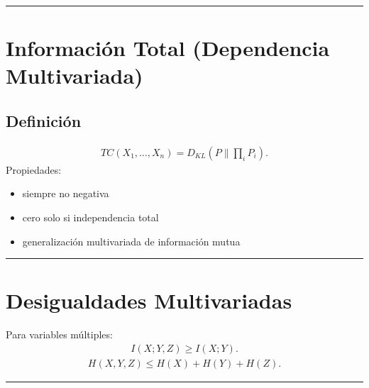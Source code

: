\documentclass[letterpaper,10pt,english]{jupyterBook}
\begin{document}
\bigskip\hrule\bigskip



\section{Información Total (Dependencia Multivariada)}
\label{\detokenize{02_mathematical_foundations/properties_theorems:informacion-total-dependencia-multivariada}}

\subsection{Definición}
\label{\detokenize{02_mathematical_foundations/properties_theorems:definicion}}\begin{equation*}
\begin{split}
TC(X_1,\dots,X_n)=
D_{KL}(P\|\prod_i P_i).
\end{split}
\end{equation*}
\sphinxAtStartPar
Propiedades:
\begin{itemize}
\item {} 
\sphinxAtStartPar
siempre no negativa

\item {} 
\sphinxAtStartPar
cero solo si independencia total

\item {} 
\sphinxAtStartPar
generalización multivariada de información mutua

\end{itemize}


\bigskip\hrule\bigskip



\section{Desigualdades Multivariadas}
\label{\detokenize{02_mathematical_foundations/properties_theorems:desigualdades-multivariadas}}
\sphinxAtStartPar
Para variables múltiples:
\begin{equation*}
\begin{split}
I(X;Y,Z)\ge I(X;Y).
\end{split}
\end{equation*}\begin{equation*}
\begin{split}
H(X,Y,Z)\le H(X)+H(Y)+H(Z).
\end{split}
\end{equation*}

\bigskip\hrule\bigskip
\end{document}
